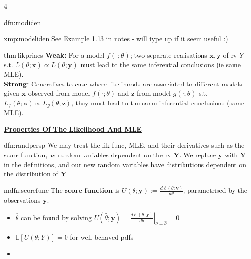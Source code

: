 \documentclass[landscape, 8pt]{extarticle}
\begin{document}
\begin{multicols*}{4}
\begin{dfn}{dfn:modiden}{ }
		\end{dfn}
		
		\begin{xmp}{xmp:modeliden}{ }
			See Example 1.13 in notes - will type up if it seem useful :)
			
		\end{xmp}
		
		
		\begin{thm}{thm:likprincs}{ }
			\textbf{Weak:} For a model $f(\cdot; \theta)$; two separate realisations $\bm{x}, \bm{y}$ of rv $Y$ s.t. $L(\theta; \bm{x}) \propto L(\theta; \bm{y})$ must lead to the same inferential conclusions (ie same MLE).\\
			\textbf{Strong:} Generalises to case where likelihoods are associated to different models - given $\bm{x}$ observed from model $f(\cdot ; \theta)$ and $\bm{z}$ from model $g(\cdot ; \theta)$ s.t. $L_f(\theta; \bm{x}) \propto L_g(\theta; \bm{z})$, they must lead to the same inferential conclusions (same MLE).
			
		\end{thm}
		
		
	{\tiny\textbf{\underline{Properties Of The Likelihood And MLE}}}
		
		\begin{dfn}{dfn:randpersp}{ }
			We may treat the lik func, MLE, and their derivatives such as the score function, as random variables dependent on the rv $\bm{Y}$. We replace $\bm{y}$ with $\bm{Y}$ in the definitions, and our new random variables have distributions dependent on the distribution of $\bm{Y}$.
			
		\end{dfn}
		
		\begin{mdfn}{mdfn:scorefunc}{ }
			The \textbf{score function} is $U(\theta; \bm{y}) := \frac{d\ell(\theta; \bm{y})}{d\theta}$, parametrised by the observations $\bm{y}$.
			\begin{itemize}
				\item $\hat\theta$ can be found by solving $U(\hat\theta; \bm{y}) = \left. \frac{d\ell(\theta; \bm{y})}{d\theta}\right| _{\theta = \hat\theta} = 0$
				\item $\mathbb{E}[U(\theta; Y)] = 0$ for well-behaved pdfs
				\item 
			\end{itemize}
			
		\end{mdfn}



\end{multicols*}
\end{document}
